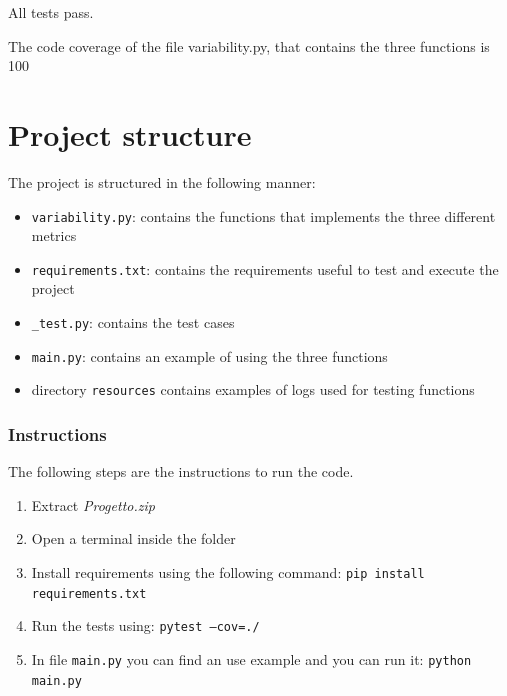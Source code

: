 \documentclass[12pt]{article}
\begin{document}
All tests pass.

The code coverage of the file variability.py, that contains the three functions is 100%

\section*{Project structure}\label{section:structure}

The project is structured in the following manner:
\begin{itemize}
	\item \texttt{variability.py}: contains the functions that implements the three different metrics
	\item \texttt{requirements.txt}: contains the requirements useful to test and execute the project
	\item \texttt{\_test.py}: contains the test cases
	\item \texttt{main.py}: contains an example of using the three functions
	\item directory \texttt{resources} contains examples of logs used for testing functions
\end{itemize}

\subsubsection*{Instructions}

The following steps are the instructions to run the code.
\begin{enumerate}
	\item Extract \textit{Progetto.zip}
	\item Open a terminal inside the folder
	\item Install requirements using the following command: \texttt{pip install requirements.txt}
	\item Run the tests using: \texttt{pytest --cov=./}
	\item In file \texttt{main.py} you can find an use example and you can run it: \texttt{python main.py}
\end{enumerate}

 

\end{document}
